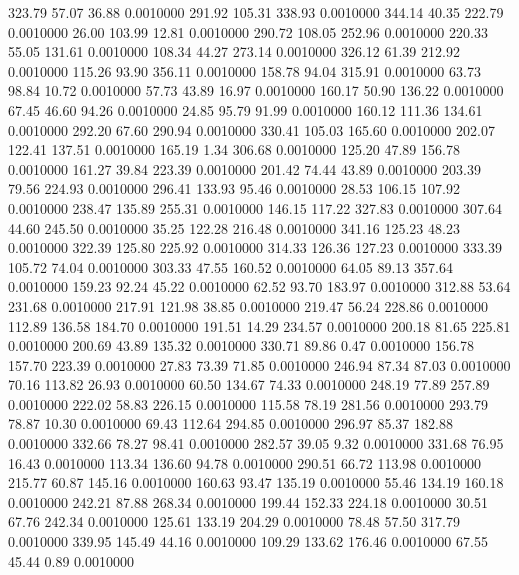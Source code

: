  323.79   57.07   36.88   0.0010000
 291.92  105.31  338.93   0.0010000
 344.14   40.35  222.79   0.0010000
  26.00  103.99   12.81   0.0010000
 290.72  108.05  252.96   0.0010000
 220.33   55.05  131.61   0.0010000
 108.34   44.27  273.14   0.0010000
 326.12   61.39  212.92   0.0010000
 115.26   93.90  356.11   0.0010000
 158.78   94.04  315.91   0.0010000
  63.73   98.84   10.72   0.0010000
  57.73   43.89   16.97   0.0010000
 160.17   50.90  136.22   0.0010000
  67.45   46.60   94.26   0.0010000
  24.85   95.79   91.99   0.0010000
 160.12  111.36  134.61   0.0010000
 292.20   67.60  290.94   0.0010000
 330.41  105.03  165.60   0.0010000
 202.07  122.41  137.51   0.0010000
 165.19    1.34  306.68   0.0010000
 125.20   47.89  156.78   0.0010000
 161.27   39.84  223.39   0.0010000
 201.42   74.44   43.89   0.0010000
 203.39   79.56  224.93   0.0010000
 296.41  133.93   95.46   0.0010000
  28.53  106.15  107.92   0.0010000
 238.47  135.89  255.31   0.0010000
 146.15  117.22  327.83   0.0010000
 307.64   44.60  245.50   0.0010000
  35.25  122.28  216.48   0.0010000
 341.16  125.23   48.23   0.0010000
 322.39  125.80  225.92   0.0010000
 314.33  126.36  127.23   0.0010000
 333.39  105.72   74.04   0.0010000
 303.33   47.55  160.52   0.0010000
  64.05   89.13  357.64   0.0010000
 159.23   92.24   45.22   0.0010000
  62.52   93.70  183.97   0.0010000
 312.88   53.64  231.68   0.0010000
 217.91  121.98   38.85   0.0010000
 219.47   56.24  228.86   0.0010000
 112.89  136.58  184.70   0.0010000
 191.51   14.29  234.57   0.0010000
 200.18   81.65  225.81   0.0010000
 200.69   43.89  135.32   0.0010000
 330.71   89.86    0.47   0.0010000
 156.78  157.70  223.39   0.0010000
  27.83   73.39   71.85   0.0010000
 246.94   87.34   87.03   0.0010000
  70.16  113.82   26.93   0.0010000
  60.50  134.67   74.33   0.0010000
 248.19   77.89  257.89   0.0010000
 222.02   58.83  226.15   0.0010000
 115.58   78.19  281.56   0.0010000
 293.79   78.87   10.30   0.0010000
  69.43  112.64  294.85   0.0010000
 296.97   85.37  182.88   0.0010000
 332.66   78.27   98.41   0.0010000
 282.57   39.05    9.32   0.0010000
 331.68   76.95   16.43   0.0010000
 113.34  136.60   94.78   0.0010000
 290.51   66.72  113.98   0.0010000
 215.77   60.87  145.16   0.0010000
 160.63   93.47  135.19   0.0010000
  55.46  134.19  160.18   0.0010000
 242.21   87.88  268.34   0.0010000
 199.44  152.33  224.18   0.0010000
  30.51   67.76  242.34   0.0010000
 125.61  133.19  204.29   0.0010000
  78.48   57.50  317.79   0.0010000
 339.95  145.49   44.16   0.0010000
 109.29  133.62  176.46   0.0010000
  67.55   45.44    0.89   0.0010000
